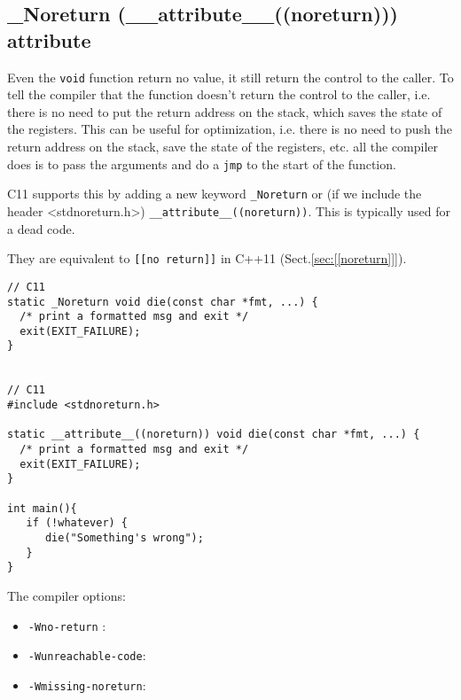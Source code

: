 \subsection[\_Noreturn]{\_Noreturn (\_\_attribute\_\_((noreturn))) attribute}
\label{sec:_Noreturn}

Even the \verb!void! function return no value, it still return the control to
the caller. To tell the compiler that the function doesn't return the control to
the caller, i.e. there is no need to put the return address on the stack, which
saves the state of the registers. This can be useful for optimization, i.e.
there is no need to push the return address on the stack, save the state of the
registers, etc. all the compiler does is to pass the arguments and do a
\verb!jmp! to the start of the function. 
 

C11 supports this by adding a new keyword \verb!_Noreturn! or (if we include the
header <stdnoreturn.h>) \verb!__attribute__((noreturn))!. This is typically used
for a dead code.


They are equivalent to \verb![[no return]]! in C++11
(Sect.\ref{sec:[[noreturn]]}).
  


\begin{verbatim}
// C11
static _Noreturn void die(const char *fmt, ...) {
  /* print a formatted msg and exit */
  exit(EXIT_FAILURE);
}


// C11
#include <stdnoreturn.h>

static __attribute__((noreturn)) void die(const char *fmt, ...) {
  /* print a formatted msg and exit */
  exit(EXIT_FAILURE);
}

int main(){
   if (!whatever) {
      die("Something's wrong");
   }
}
\end{verbatim}

The compiler options:
\begin{itemize}
  \item \verb!-Wno-return! : 
  \item \verb!-Wunreachable-code!: 
  \item \verb!-Wmissing-noreturn!: 
\end{itemize}

